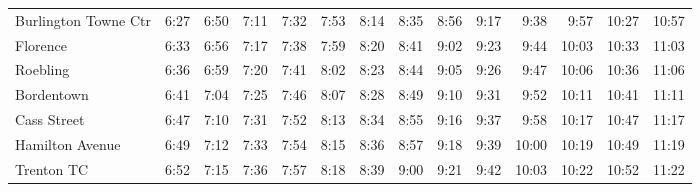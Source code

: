 \begin{center}
\begin{tabular}{@{}lrrrrrrrrrrrrr@{}}
Burlington Towne Ctr & 6:27 & 6:50 & 7:11 & 7:32 & 7:53 & 8:14 & 8:35 & 8:56 & 9:17 & 9:38 & 9:57 & 10:27 & 10:57 \\
Florence & 6:33 & 6:56 & 7:17 & 7:38 & 7:59 & 8:20 & 8:41 & 9:02 & 9:23 & 9:44 & 10:03 & 10:33 & 11:03 \\
Roebling & 6:36 & 6:59 & 7:20 & 7:41 & 8:02 & 8:23 & 8:44 & 9:05 & 9:26 & 9:47 & 10:06 & 10:36 & 11:06 \\
Bordentown & 6:41 & 7:04 & 7:25 & 7:46 & 8:07 & 8:28 & 8:49 & 9:10 & 9:31 & 9:52 & 10:11 & 10:41 & 11:11 \\
Cass Street & 6:47 & 7:10 & 7:31 & 7:52 & 8:13 & 8:34 & 8:55 & 9:16 & 9:37 & 9:58 & 10:17 & 10:47 & 11:17 \\
Hamilton Avenue & 6:49 & 7:12 & 7:33 & 7:54 & 8:15 & 8:36 & 8:57 & 9:18 & 9:39 & 10:00 & 10:19 & 10:49 & 11:19 \\
Trenton TC & 6:52 & 7:15 & 7:36 & 7:57 & 8:18 & 8:39 & 9:00 & 9:21 & 9:42 & 10:03 & 10:22 & 10:52 & 11:22 \\
\bottomrule\end{tabular}\end{center}
